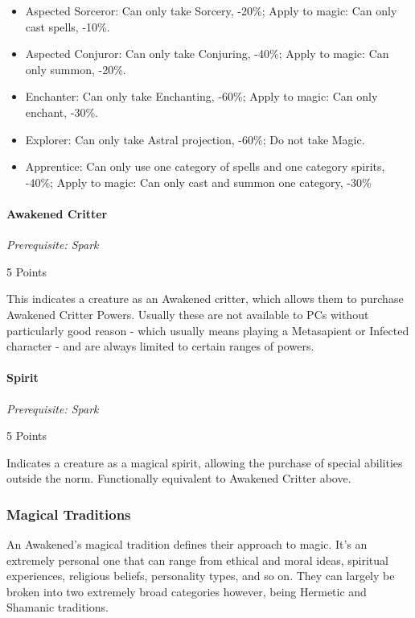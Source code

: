 \begin{multicols}{3}
	\begin{itemize}
		\itemsep0em 
		\item Aspected Sorceror: Can only take Sorcery, -20\%; Apply to magic: Can only cast spells, -10\%.
		\item Aspected Conjuror: Can only take Conjuring, -40\%; Apply to magic: Can only summon, -20\%.
		\item Enchanter: Can only take Enchanting, -60\%; Apply to magic: Can only enchant, -30\%.
		\item Explorer: Can only take Astral projection, -60\%; Do not take Magic.
		\item Apprentice: Can only use one category of spells and one category spirits, -40\%; Apply to magic: Can only cast and summon one category, -30\%
	\end{itemize}
	
	\paragraph{Awakened Critter}\label{awakened_critter}
	\textit{Prerequisite: Spark}
	\begin{flushright}
		5 Points
	\end{flushright}
	
	This indicates a creature as an Awakened critter, which allows them to purchase Awakened Critter Powers. Usually these are not available to PCs without particularly good reason - which usually means playing a Metasapient or Infected character - and are always limited to certain ranges of powers.
	
	\paragraph{Spirit}
	\textit{Prerequisite: Spark}
	\begin{flushright}
		5 Points
	\end{flushright}
	
	Indicates a creature as a magical spirit, allowing the purchase of special abilities outside the norm. Functionally equivalent to Awakened Critter above.
	
	\subsubsection{Magical Traditions}
	
	An Awakened's magical tradition defines their approach to magic. It's an extremely personal one that can range from ethical and moral ideas, spiritual experiences, religious beliefs, personality types, and so on. They can largely be broken into two extremely broad categories however, being Hermetic and Shamanic traditions.
	

\end{multicols}
